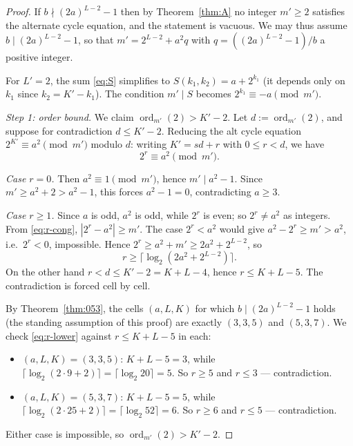 \documentclass[11pt]{amsart}
\theoremstyle{plain}
\theoremstyle{definition}
\DeclareMathOperator{\ord}{ord}
\begin{document}
\begin{proof}
If $b \nmid (2a)^{L-2} - 1$ then by Theorem~\ref{thm:A} no integer
$m' \geq 2$ satisfies the alternate cycle equation, and the statement
is vacuous. We may thus assume $b \mid (2a)^{L-2} - 1$, so that
$m' = 2^{L-2} + a^2 q$ with $q = ((2a)^{L-2} - 1)/b$ a positive
integer.

For $L' = 2$, the sum \eqref{eq:S} simplifies to
$S(k_1, k_2) = a + 2^{k_1}$ (it depends only on $k_1$ since
$k_2 = K' - k_1$). The condition $m' \mid S$ becomes
$2^{k_1} \equiv -a \pmod{m'}$.

\textit{Step 1: order bound.} We claim $\ord_{m'}(2) > K' - 2$.
Let $d := \ord_{m'}(2)$, and suppose for contradiction
$d \leq K' - 2$. Reducing the alt cycle equation
$2^{K'} \equiv a^2 \pmod{m'}$ modulo $d$: writing $K' = sd + r$
with $0 \leq r < d$, we have
\begin{equation} \label{eq:r-cong}
2^r \equiv a^2 \pmod{m'}.
\end{equation}

\textit{Case $r = 0$.} Then $a^2 \equiv 1 \pmod{m'}$, hence
$m' \mid a^2 - 1$. Since $m' \geq a^2 + 2 > a^2 - 1$, this forces
$a^2 - 1 = 0$, contradicting $a \geq 3$.

\textit{Case $r \geq 1$.} Since $a$ is odd, $a^2$ is odd, while
$2^r$ is even; so $2^r \neq a^2$ as integers. From
\eqref{eq:r-cong}, $|2^r - a^2| \geq m'$. The case $2^r < a^2$ would
give $a^2 - 2^r \geq m' > a^2$, i.e.~$2^r < 0$, impossible. Hence
$2^r \geq a^2 + m' \geq 2a^2 + 2^{L-2}$, so
\begin{equation} \label{eq:r-lower}
r \geq \big\lceil \log_2(2a^2 + 2^{L-2}) \big\rceil.
\end{equation}
On the other hand $r < d \leq K' - 2 = K + L - 4$, hence
$r \leq K + L - 5$. The contradiction is forced cell by cell.

By Theorem~\ref{thm:053}, the cells $(a, L, K)$ for which
$b \mid (2a)^{L-2} - 1$ holds (the standing assumption of this
proof) are exactly $(3, 3, 5)$ and $(5, 3, 7)$. We check
\eqref{eq:r-lower} against $r \leq K + L - 5$ in each:
\begin{itemize}
\item $(a, L, K) = (3, 3, 5)$: $K + L - 5 = 3$, while
  $\lceil \log_2(2 \cdot 9 + 2) \rceil = \lceil \log_2 20 \rceil = 5$.
  So $r \geq 5$ and $r \leq 3$ — contradiction.
\item $(a, L, K) = (5, 3, 7)$: $K + L - 5 = 5$, while
  $\lceil \log_2(2 \cdot 25 + 2) \rceil = \lceil \log_2 52 \rceil = 6$.
  So $r \geq 6$ and $r \leq 5$ — contradiction.
\end{itemize}
Either case is impossible, so $\ord_{m'}(2) > K' - 2$.


\end{proof}
\end{document}
